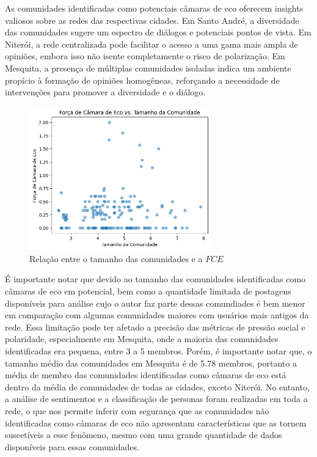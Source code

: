As comunidades identificadas como potenciais câmaras de eco oferecem insights valiosos sobre as redes das respectivas cidades. Em Santo André, a diversidade das comunidades sugere um espectro de diálogos e potenciais pontos de vista. Em Niterói, a rede centralizada pode facilitar o acesso a uma gama mais ampla de opiniões, embora isso não isente completamente o risco de polarização. Em Mesquita, a presença de múltiplas comunidades isoladas indica um ambiente propício à formação de opiniões homogêneas, reforçando a necessidade de intervenções para promover a diversidade e o diálogo.

\begin{figure}[htb]
	\centering
	\includegraphics[width=0.7\textwidth]{images/echo_chamber_strength_by_size.png}
	\caption{Relação entre o tamanho das comunidades e a $FCE$}
	\label{fig:echo_chamber_strength_by_size}
\end{figure}

É importante notar que devido ao tamanho das comunidades identificadas como câmaras de eco em potencial, bem como a quantidade limitada de postagens disponíveis para análise cujo o autor faz parte dessas comundiades é bem menor em comparação com algumas comunidades maiores com usuários mais antigos da rede. Essa limitação pode ter afetado a precisão das métricas de pressão social e polaridade, especialmente em Mesquita, onde a maioria das comunidades identificadas era pequena, entre 3 a 5 membros. Porém, é importante notar que, o tamanho médio das comunidades em Mesquita é de 5.78 membros, portanto a média de membro das comunidades identificadas como câmaras de eco está dentro da média de comunidades de todas as cidades, exceto Niterói. No entanto, a análise de sentimentos e a classificação de personas foram realizadas em toda a rede, o que nos permite inferir com segurança que as comunidades não identificadas como câmaras de eco não apresentam características que as tornem suscetíveis a esse fenômeno, mesmo com uma grande quantidade de dados disponíveis para essas comunidades.

